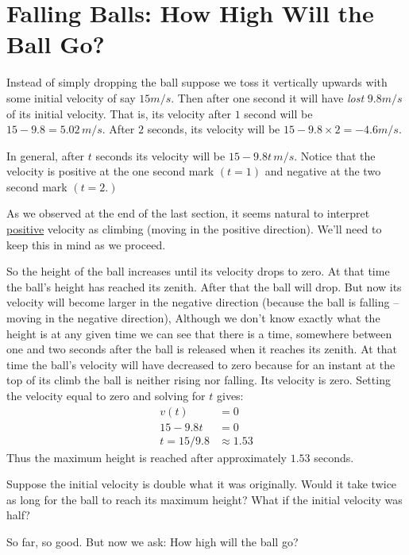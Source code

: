 \section{Falling Balls: How High Will the Ball Go?}
\label{sec:tossed-ball}
Instead of simply dropping the ball suppose we toss it vertically
upwards with some initial velocity of say \(15 m/s.\) Then after one
second it will have \emph{lost} \(9.8 m/s\) of its initial
velocity. That is, its velocity after \(1\) second will be
\(15-9.8=5.02\,m/s.\) After \(2\) seconds, its velocity will be
\(15-9.8\times{}2=-4.6 m/s.\)

In general, after \(t\) seconds its velocity will be \(15-9.8t\, m/s.\) 
Notice that the velocity is positive at the one second mark $(t=1)$
and negative at the two second mark $(t=2.)$

As we observed at the end of the last section, it seems natural to
interpret \underline{positive} velocity as climbing (moving in the
positive direction). We'll need to keep this in mind as we proceed.

So the height of the ball increases until its velocity drops to
zero. At that time the ball's height has reached its zenith. After
that the ball will drop. But now its velocity will become larger in
the negative direction (because the ball is falling -- moving in the
negative direction), Although we don't know exactly what the height is
at any given time we can see that there is a time, somewhere between
one and two seconds after the ball is released when it reaches its
zenith. At that time the ball's velocity will have decreased to zero
because for an instant at the top of its climb the ball is neither
rising nor falling. Its velocity is
zero. Setting the velocity equal to zero and solving for $t$ gives:
\begin{align*}
  v(t)&=0\\
  15-9.8 t&=0 \\
  t=15/9.8&\approx 1.53 
\end{align*}
Thus the  maximum height is reached after approximately $1.53$ seconds.

\begin{embeddedproblem}{}
  Suppose the initial velocity is double what it was originally.
  Would it take twice as long for the ball to reach its maximum
  height?  What if the initial velocity was half?
\end{embeddedproblem}

So far, so good.  But now we ask: How high will the ball go? 

